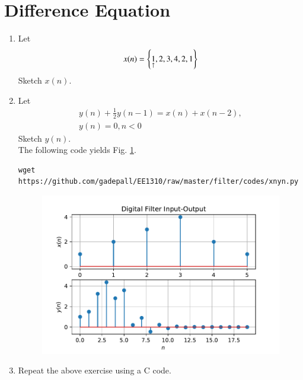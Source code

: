 \documentclass[journal,12pt,twocolumn]{IEEEtran}
\renewcommand\thesection{\arabic{section}}
\begin{document}
\section{Difference Equation}
\begin{enumerate}[label=\thesection.\arabic*,ref=\thesection.\theenumi]
\item Let
	\label{def:xn}
\begin{equation}
x(n) = \left\{\underset{\uparrow}{1},2,3,4,2,1\right\}
\end{equation}
Sketch $x(n)$.
\item Let
\begin{multline}
\label{eq:iir_filter}
y(n) + \frac{1}{2}y(n-1) = x(n) + x(n-2), 
\\
 y(n) = 0, n < 0
\end{multline}
Sketch $y(n)$.  
\\
\solution The following code yields Fig. \ref{fig:xnyn}.
\begin{lstlisting}
wget https://github.com/gadepall/EE1310/raw/master/filter/codes/xnyn.py
\end{lstlisting}
\begin{figure}[!ht]
\begin{center}
\includegraphics[width=\columnwidth]{./figs/xnyn}
\end{center}
\label{fig:xnyn}	
\end{figure}
\item Repeat the above exercise using a C code.
\end{enumerate}
\end{document}
